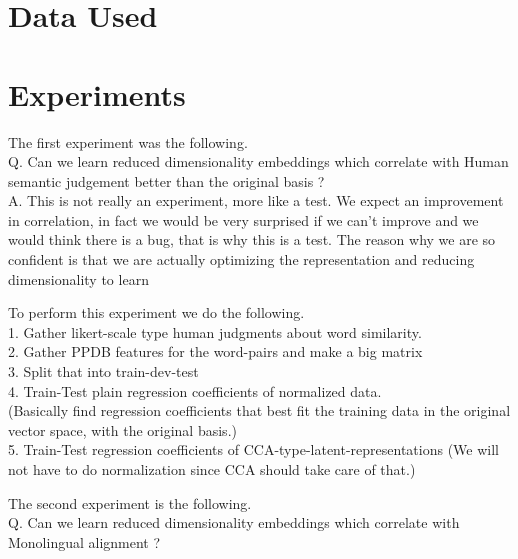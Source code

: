 \documentclass[11pt]{article}
\begin{document}
\section{Data Used}


\section{Experiments}
The first experiment was the following. \\
Q. Can we learn reduced dimensionality embeddings which correlate with
Human semantic judgement better than the original basis ? \\
A. This is not really an experiment, more like a test. We expect an
improvement in correlation, in fact we would be very 
surprised if we can't improve and we would think there is a bug, that
is why this is a test. The reason why we are so confident is that we are actually
optimizing the representation and reducing dimensionality to learn 

To perform this experiment we do the following.\\
1. Gather likert-scale type human judgments about word similarity.\\
2. Gather PPDB features for the word-pairs and make a big matrix \\
3. Split that into train-dev-test\\
4. Train-Test plain regression coefficients of normalized data. \\
   (Basically find regression coefficients that best fit the training
data in the original vector space, with the original basis.)\\
5. Train-Test regression coefficients of CCA-type-latent-representations (We will not have to do normalization since CCA should take care of that.)

The second experiment is the following. \\
Q. Can we learn reduced dimensionality embeddings which correlate with
Monolingual alignment ?  \\








\end{document}
